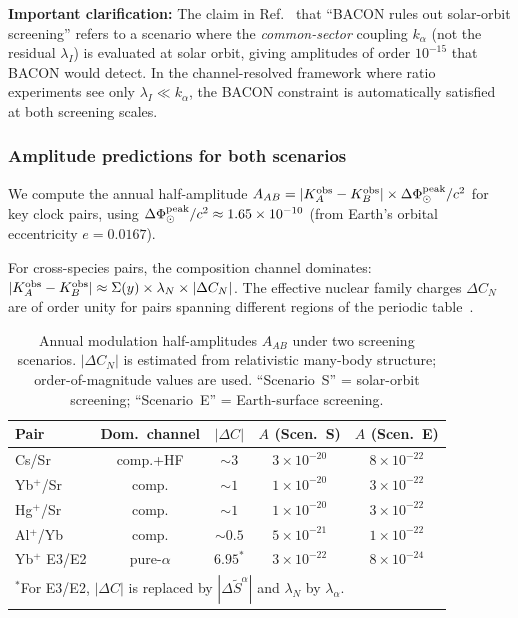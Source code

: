 \documentclass[twocolumn,showpacs,preprintnumbers,amsmath,amssymb,prd]{revtex4-2}
\newcommand{\kalpha}{k_\alpha}
\begin{document}
\textbf{Important clarification:} The claim in
Ref.~\cite[Sec.~10.4]{Alcock2025_DFD_v32} that ``BACON rules
out solar-orbit screening'' refers to a scenario where the
\emph{common-sector} coupling $\kalpha$ (not the residual
$\lambda_I$) is evaluated at solar orbit, giving amplitudes of
order $10^{-15}$ that BACON would detect.  In the
channel-resolved framework where ratio experiments see only
$\lambda_I \ll \kalpha$, the BACON constraint is automatically
satisfied at both screening scales.

\subsubsection{Amplitude predictions for both scenarios}
\label{sec:amplitudes}

We compute the annual half-amplitude
$A_{AB} = |K_A^{\rm obs} - K_B^{\rm obs}| \times
\Delta\Phi_\odot^{\rm peak}/c^2$ for key clock pairs, using
$\Delta\Phi_\odot^{\rm peak}/c^2 \approx 1.65 \times 10^{-10}$
(from Earth's orbital eccentricity $e = 0.0167$).

For cross-species pairs, the composition channel dominates:
$|K_A^{\rm obs} - K_B^{\rm obs}|
\approx \Sigma(y) \times \lambda_N \times |\Delta C_N|$.
The effective nuclear family charges $\Delta C_N$ are of order
unity for pairs spanning different regions of the periodic
table~\cite[Eq.~(9.6)]{Alcock2025_DFD_v32}.

\begin{table}[h]
\centering
\caption{Annual modulation half-amplitudes $A_{AB}$ under two
screening scenarios.  $|\Delta C_N|$ is estimated from
relativistic many-body structure; order-of-magnitude values
are used.  ``Scenario~S'' = solar-orbit screening;
``Scenario~E'' = Earth-surface screening.}
\label{tab:amplitudes}
\renewcommand{\arraystretch}{1.15}
\small
\begin{tabular}{@{}lcccc@{}}
\toprule
Pair & Dom.\ channel & $|\Delta C|$ & $A$ (Scen.~S) & $A$ (Scen.~E) \\
\midrule
Cs/Sr & comp.+HF & $\sim 3$ & $3 \times 10^{-20}$ & $8 \times 10^{-22}$ \\
Yb$^+$/Sr & comp. & $\sim 1$ & $1 \times 10^{-20}$ & $3 \times 10^{-22}$ \\
Hg$^+$/Sr & comp. & $\sim 1$ & $1 \times 10^{-20}$ & $3 \times 10^{-22}$ \\
Al$^+$/Yb & comp. & $\sim 0.5$ & $5 \times 10^{-21}$ & $1 \times 10^{-22}$ \\
Yb$^+$ E3/E2 & pure-$\alpha$ & $6.95^*$ & $3 \times 10^{-22}$ & $8 \times 10^{-24}$ \\
\bottomrule
\multicolumn{5}{l}{\footnotesize $^*$For E3/E2, $|\Delta C|$
is replaced by $|\Delta\widetilde{S}^\alpha|$ and $\lambda_N$
by $\lambda_\alpha$.}
\end{tabular}
\end{table}
\end{document}
